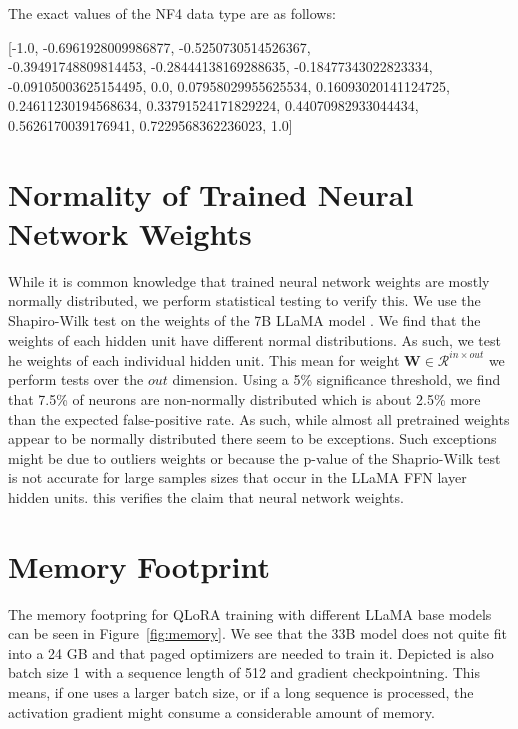 \documentclass{article}
\begin{document}
The exact values of the NF4 data type are as follows:

[-1.0, -0.6961928009986877, -0.5250730514526367,\\
-0.39491748809814453, -0.28444138169288635, -0.18477343022823334,\\
-0.09105003625154495, 0.0, 0.07958029955625534, 0.16093020141124725,\\
0.24611230194568634, 0.33791524171829224, 0.44070982933044434,\\
0.5626170039176941, 0.7229568362236023, 1.0]

\section{Normality of Trained Neural Network Weights}
\label{app:normality}

While it is common knowledge that trained neural network weights are mostly normally distributed, we perform statistical testing to verify this. We use the Shapiro-Wilk test\citep{shaphiro1965analysis} on the weights of the 7B LLaMA model \citep{touvron2023llama}. We find that the weights of each hidden unit have different normal distributions. As such, we test he weights of each individual hidden unit. This mean for weight $\mathbf{W} \in  \mathcal{R}^{in \times out}$ we perform tests over the $out$ dimension. Using a 5\% significance threshold, we find that 7.5\% of neurons are non-normally distributed which is about 2.5\% more than the expected false-positive rate. As such, while almost all pretrained weights appear to be normally distributed there seem to be exceptions. Such exceptions might be due to outliers weights \citep{dettmers2022case} or because the p-value of the Shaprio-Wilk test is not accurate for large samples sizes\citep{shaphiro1965analysis} that occur in the LLaMA FFN layer hidden units. this verifies the claim that neural network weights.


\section{Memory Footprint}
\label{app:memory}

The memory footpring for QLoRA training with different LLaMA base models can be seen in Figure~\ref{fig:memory}. We see that the 33B model does not quite fit into a 24 GB and that paged optimizers are needed to train it. Depicted is also batch size 1 with a sequence length of 512 and gradient checkpointning. This means, if one uses a larger batch size, or if a long sequence is processed, the activation gradient might consume a considerable amount of memory.
\end{document}
